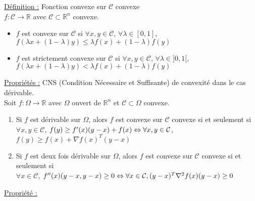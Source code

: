 \documentclass[12pt,a4paper]{article}
\begin{document}
\par


\underline{Définition :} Fonction convexe sur $\mathcal{C}$ convexe\\

$f : \mathcal{C} \rightarrow \mathbb{R}$ avec $\mathcal{C} \subset \mathbb{R}^n$ convexe.
\begin{itemize}
    \item $f$ est convexe sur $\mathcal{C}$ si $\forall x, y \in \mathcal{C}$, $\forall \lambda \in [0, 1]$, $f(\lambda x + (1 - \lambda) y) \leq \lambda f(x) + (1 - \lambda) f(y)$
    \item $f$ est strictement convexe sur $\mathcal{C}$ si $\forall x, y \in \mathcal{C}$, $\forall \lambda \in ]0, 1[$, $f(\lambda x + (1 - \lambda) y) < \lambda f(x) + (1 - \lambda) f(y)$
\end{itemize}

\underline{Propriétés :} CNS (Condition Nécessaire et Suffisante) de convexité dans le cas dérivable.\\

Soit $f : \Omega \rightarrow \mathbb{R}$ avec $\Omega$ ouvert de $\mathbb{R}^n$ et $\mathcal{C} \subset \Omega$ convexe.\\
\begin{enumerate}
    \item Si $f$ est dérivable sur $\Omega$, alors $f$ est convexe sur $\mathcal{C}$ convexe si et seulement si \\
    $\forall x, y \in \mathcal{C}$, $f(y) \geq f'(x)(y - x) + f(x)\\
    \Leftrightarrow \forall x, y \in \mathcal{C}$, $f(y) \geq f(x) + \nabla f(x)^T(y - x)$
    \item Si $f$ est deux fois dérivable sur $\Omega$, alors $f$ est convexe sur $\mathcal{C}$ convexe si et seulement si \\
    $\forall x \in \mathcal{C}$, $f''(x)(y - x, y - x) \geq 0\\
    \Leftrightarrow \forall x \in \mathcal{C}, (y - x)^T \nabla^2 f(x) (y - x) \geq 0$
\end{enumerate}

\underline{Propriété :}
\end{document}
